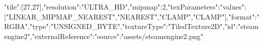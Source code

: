 {"tile":[27,27],"resolution":"ULTRA_HD","mipmap":2,"texParameters":{"values":["LINEAR_MIPMAP_NEAREST","NEAREST","CLAMP","CLAMP"]},"format":"RGBA","type":"UNSIGNED_BYTE","textureType":"TiledTexture2D","id":"steamengine2","externalReference":{"source":"assets/steamengine2.png"}}